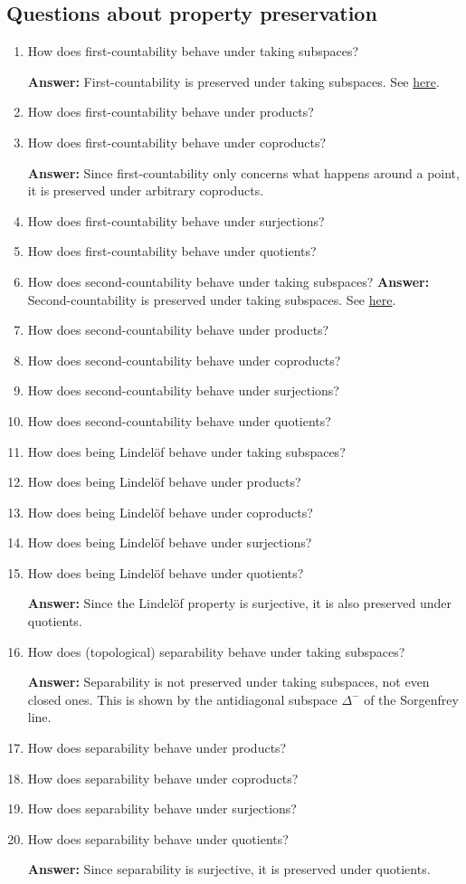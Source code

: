\subsection{Questions about property preservation}
\begin{enumerate}
    \item How does first-countability behave under taking subspaces?

    \textbf{Answer: } First-countability is preserved under taking subspaces. See \hyperlink{FirstSecondCountabilityHereditary}{here}.
    \item How does first-countability behave under products?
    \item How does first-countability behave under coproducts?

    \textbf{Answer: } Since first-countability only concerns what happens around a point, it is preserved under arbitrary coproducts.
    \item How does first-countability behave under surjections?
    \item How does first-countability behave under quotients?
    \item How does second-countability behave under taking subspaces?
    \textbf{Answer: } Second-countability is preserved under taking subspaces. See \hyperlink{FirstSecondCountabilityHereditary}{here}.
    \item How does second-countability behave under products?
    \item How does second-countability behave under coproducts?
    \item How does second-countability behave under surjections?
    \item How does second-countability behave under quotients?
    \item How does being Lindel\"of behave under taking subspaces?
    \item How does being Lindel\"of behave under products?
    \item How does being Lindel\"of behave under coproducts?
    \item How does being Lindel\"of behave under surjections?
    \item How does being Lindel\"of behave under quotients?

    \textbf{Answer:} Since the Lindel\"of property is surjective, it is also preserved under quotients.
    \item How does (topological) separability behave under taking subspaces?
    
    \textbf{Answer:} Separability is not preserved under taking subspaces, not even closed ones. This is shown by the antidiagonal subspace \( \Delta^- \) of the Sorgenfrey line.
    \item How does separability behave under products?
    \item How does separability behave under coproducts?
    \item How does separability behave under surjections?
    \item How does separability behave under quotients?
    
    \textbf{Answer:} Since separability is surjective, it is preserved under quotients.
\end{enumerate}
